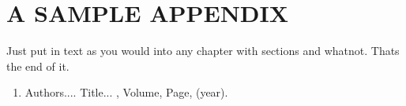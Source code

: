 \documentclass[PhD]{iiitd}
\begin{document}
\appendix

\chapter{A SAMPLE APPENDIX}

Just put in text as you would into any chapter with sections and
whatnot.  Thats the end of it.


\begin{singlespace}
  
\end{singlespace}



\listofpapers

\begin{enumerate}  
\item Authors....  \newblock
 Title...
  , Volume,
  Page, (year).
\end{enumerate}  
\end{document}
